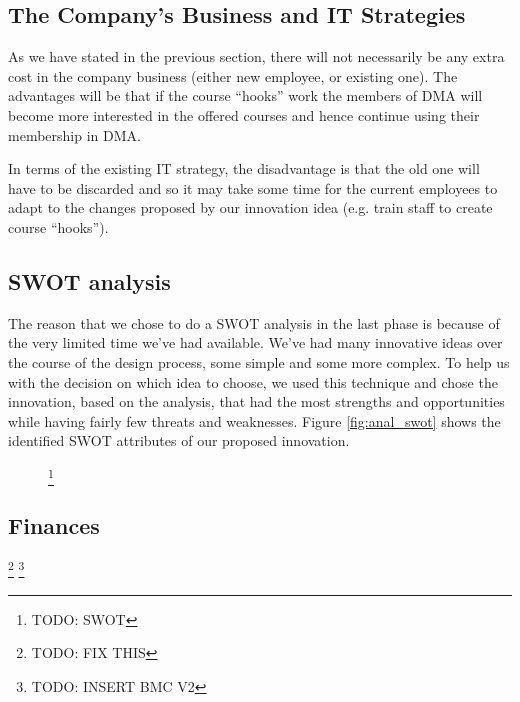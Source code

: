 \subsection{The Company’s Business and IT Strategies}
As we have stated in the previous section, there will not necessarily be any extra cost in the company business (either new employee, or existing one). The advantages will be that if the course “hooks” work the members of DMA will become more interested in the offered courses and hence continue using their membership in DMA.

In terms of the existing IT strategy, the disadvantage is that the old one will have to be discarded and so it may take some time for the current employees to adapt to the changes proposed by our innovation idea (e.g. train staff to create course “hooks”). 


\subsection{SWOT analysis}
The reason that we chose to do a SWOT analysis in the last phase is because of the very limited time we’ve had available. We’ve had many innovative ideas over the course of the design process, some simple and some more complex. To help us with the decision on which idea to choose, we used this technique and chose the innovation, based on the analysis, that had the most strengths and opportunities while having fairly few threats and weaknesses. Figure \ref{fig:anal_swot} shows the identified SWOT attributes of our proposed innovation. 

\begin{figure}
\footnote{TODO: SWOT}
\end{figure}

\subsection{Finances}
\footnote{TODO: FIX THIS}
\footnote{TODO: INSERT BMC V2}

